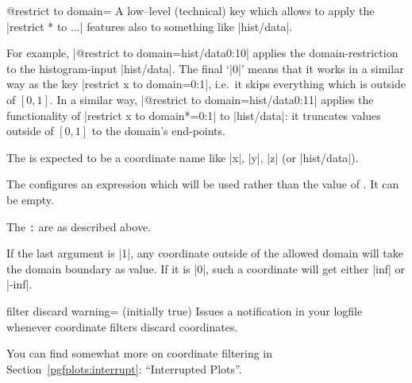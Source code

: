 \begin{pgfplotskey}{@restrict to domain=}
	A low--level (technical) key which allows to apply the |restrict * to ...| features also to something like |hist/data|.

	For example,
	|@restrict to domain={hist/data}{}{0:1}{0}| applies the domain-restriction to the histogram-input |hist/data|. The final `|0|' means that it works in a similar way as the key |restrict x to domain=0:1|, i.e.\ it skips everything which is outside of $[0,1]$.  In a similar way, 
	|@restrict to domain={hist/data}{}{0:1}{1}| applies the functionality of |restrict x to domain*=0:1| to |hist/data|: it truncates values outside of $[0,1]$ to the domain's end-points.

	The  is expected to be a coordinate name like |x|, |y|, |z| (or |hist/data|).

	The  configures an expression which will be used rather than the value of . It can be empty.

	The \texttt{:} are as described above.

	If the last argument is |1|, any coordinate outside of the allowed domain will take the domain boundary as value. If it is |0|, such a coordinate will get either |inf| or |-inf|.
\end{pgfplotskey}

\begin{pgfplotskey}{filter discard warning= (initially true)}
	Issues a notification in your logfile whenever coordinate filters discard coordinates.
\end{pgfplotskey}

You can find somewhat more on coordinate filtering in Section~\ref{pgfplots:interrupt}: ``Interrupted Plots''.
